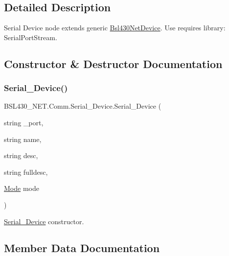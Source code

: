 \subsection{Detailed Description}
Serial Device node extends generic \mbox{\hyperlink{class_b_s_l430___n_e_t_1_1_bsl430_net_device}{Bsl430\+Net\+Device}}. Use requires library\+: Serial\+Port\+Stream. 



\subsection{Constructor \& Destructor Documentation}
\mbox{\label{class_b_s_l430___n_e_t_1_1_comm_1_1_serial___device_a85a4a2cc35a431d0b5b5e51d4c964365}} 
\subsubsection{\texorpdfstring{Serial\_Device()}{Serial\_Device()}}
{\footnotesize\ttfamily B\+S\+L430\+\_\+\+N\+E\+T.\+Comm.\+Serial\+\_\+\+Device.\+Serial\+\_\+\+Device (\begin{DoxyParamCaption}\item[{string}]{\+\_\+port,  }\item[{string}]{name,  }\item[{string}]{desc,  }\item[{string}]{fulldesc,  }\item[{\mbox{\hyperlink{namespace_b_s_l430___n_e_t_aa1c6981cb6f279b5491d861ca555a1d7}{Mode}}}]{mode }\end{DoxyParamCaption})}



\mbox{\hyperlink{class_b_s_l430___n_e_t_1_1_comm_1_1_serial___device}{Serial\+\_\+\+Device}} constructor. 



\subsection{Member Data Documentation}
\mbox{\label{class_b_s_l430___n_e_t_1_1_comm_1_1_serial___device_ae689000702f17c930096f23930424b64}} 
